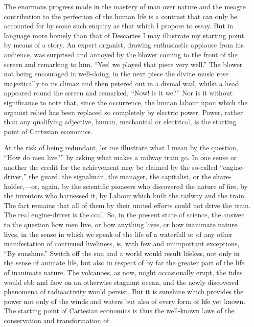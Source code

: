 \documentclass[10.5pt,twoside]{book}
\newcommand{\origpage}[1]{\clearpage\setcounter{page}{#1}}
\begin{document}
\origpage{4}

The enormous progress made in the mastery of man over nature and the meagre
contribution to the perfection of the human life is a contrast that can only
be accounted for by some such enquiry as that which I propose to essay. But in
language more homely than that of Descartes I may illustrate my starting point
by means of a story. An expert organist, drawing enthusiastic applause from
his audience, was surprised and annoyed by the blower coming to the front of
the screen and remarking to him, ``Yes! we played that piece very well.'' The
blower not being encouraged in well-doing, in the next piece the divine music
rose majestically to its climax and then petered out in a dismal wail, whilst
a head appeared round the screen and remarked, ``Now! is it we?'' Nor is it
without significance to note that, since the occurrence, the human labour upon
which the organist relied has been replaced so completely by electric power.
Power, rather than any qualifying adjective, human, mechanical or electrical,
is the starting point of Cartesian economics.

At the risk of being redundant, let me illustrate what I mean by the question,
``How do men live?'' by asking what makes a railway train go. In one sense or
another the credit for the achievement may be claimed by the so-called
``engine-driver,'' the guard, the signalman, the manager, the capitalist, or
the share-holder,---or, again, by the scientific pioneers who discovered the
nature of fire, by the inventors who harnessed it, by Labour which built the
railway and the train. The fact remains that all of them by their united
efforts could not drive the train. The real engine-driver is the coal. So, in
the present state of science, the answer to the question how men live, or how
anything lives, or how inanimate nature lives, in the sense in which we speak
of the life of a waterfall or of any other manifestation of continued
liveliness, is, with few and unimportant exceptions, ``By sunshine.'' Switch
off the sun and a world would result lifeless, not only in the sense of
animate life, but also in respect of by far the greater part of the life of
inanimate nature. The volcanoes, as now, might occasionally erupt, the tides
would ebb and flow on an otherwise stagnant ocean, and the newly discovered
phenomena of radioactivity would persist. But it is sunshine which provides
the power not only of the winds and waters but also of every form of life yet
known. The starting point of Cartesian economics is thus the well-known laws
of the conservation and transformation of
\end{document}
